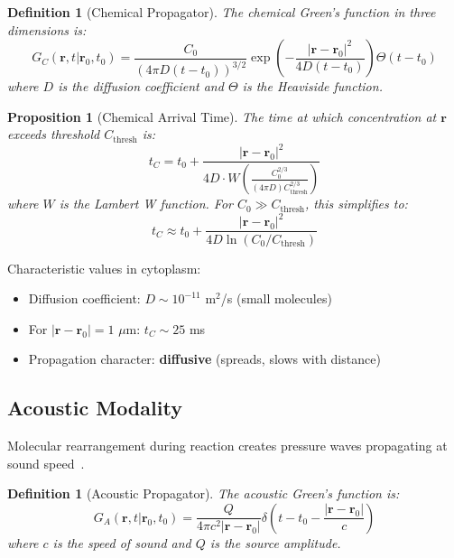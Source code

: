 \documentclass[11pt,a4paper]{article}
\newtheorem{definition}[theorem]{Definition}
\newtheorem{proposition}[theorem]{Proposition}
\theoremstyle{remark}
\newcommand{\rxnpos}{\mathbf{r}_0}
\newcommand{\rxntime}{t_0}
\newcommand{\obspos}{\mathbf{r}}
\begin{document}
\begin{definition}[Chemical Propagator]
The chemical Green's function in three dimensions is:
\begin{equation}
    G_C(\mathbf{r}, t | \rxnpos, \rxntime) = \frac{C_0}{(4\pi D (t-\rxntime))^{3/2}} \exp\left(-\frac{|\mathbf{r} - \rxnpos|^2}{4D(t-\rxntime)}\right) \Theta(t - \rxntime)
\end{equation}
where $D$ is the diffusion coefficient and $\Theta$ is the Heaviside function.
\end{definition}

\begin{proposition}[Chemical Arrival Time]
\label{prop:chem_arrival}
The time at which concentration at $\obspos$ exceeds threshold $C_{\text{thresh}}$ is:
\begin{equation}
    t_C = \rxntime + \frac{|\obspos - \rxnpos|^2}{4D \cdot W\left(\frac{C_0^{2/3}}{(4\pi D)C_{\text{thresh}}^{2/3}}\right)}
\end{equation}
where $W$ is the Lambert W function. For $C_0 \gg C_{\text{thresh}}$, this simplifies to:
\begin{equation}
    t_C \approx \rxntime + \frac{|\obspos - \rxnpos|^2}{4D \ln(C_0/C_{\text{thresh}})}
\end{equation}
\end{proposition}

Characteristic values in cytoplasm:
\begin{itemize}
    \item Diffusion coefficient: $D \sim 10^{-11}$ m$^2$/s (small molecules)
    \item For $|\obspos - \rxnpos| = 1$ $\mu$m: $t_C \sim 25$ ms
    \item Propagation character: \textbf{diffusive} (spreads, slows with distance)
\end{itemize}

\subsection{Acoustic Modality}

Molecular rearrangement during reaction creates pressure waves propagating at sound speed~\citep{duck1990physical,greenspan1957propagation}.

\begin{definition}[Acoustic Propagator]
The acoustic Green's function is:
\begin{equation}
    G_A(\mathbf{r}, t | \rxnpos, \rxntime) = \frac{Q}{4\pi c^2 |\mathbf{r} - \rxnpos|} \delta\left(t - \rxntime - \frac{|\mathbf{r} - \rxnpos|}{c}\right)
\end{equation}
where $c$ is the speed of sound and $Q$ is the source amplitude.
\end{definition}
\end{document}
